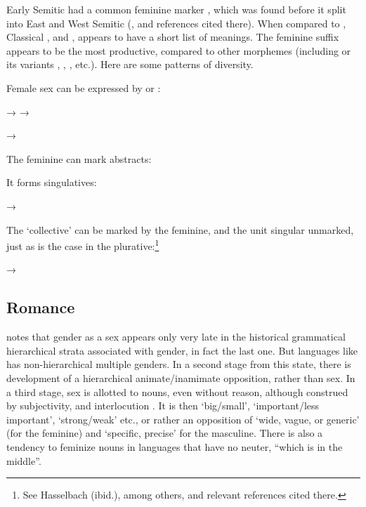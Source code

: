 Early Semitic had a common feminine marker , which was found
 before it split into East and West Semitic (\citealt{Hasselbach2014}, and references cited there).
 When compared to
, Classical , and ,  appears to have a short list of
meanings. The feminine suffix  appears to be the most productive,
compared to other morphemes (including  or its variants ,
, , etc.). Here are some patterns of  diversity.

Female sex can be expressed by  or :

\begin{exe}
  \ex\label{ex:fassi:62}
  \begin{xlist}
    \ex\label{ex:fassi:62a}  → 
    \ex\label{ex:fassi:62b}  → 
  \end{xlist}
  \ex\label{ex:fassi:63}  → 
\end{exe}
%
The feminine can mark abstracts:

\begin{exe}
  \ex\label{ex:fassi:64} 
\end{exe}
%
It forms singulatives:

\begin{exe}
  \ex\label{ex:fassi:65}  → 
\end{exe}
%
The `collective' can be marked by the feminine, and the unit singular unmarked,
just as is the case in the  plurative:\footnote{See Hasselbach (ibid.),
among others, and relevant references cited there.}

\begin{exe}
  \ex\label{ex:fassi:66}
  \begin{xlist}
    \ex\label{ex:fassi:66a}  → 
    \ex\label{ex:fassi:66b} 
  \end{xlist}
\end{exe}

\subsection{Romance}

\citet{DeLaGrasserie1904} notes that gender as a sex appears only very late in
the historical grammatical hierarchical strata associated with gender, in fact
the last one. But languages like  has non-hierarchical multiple genders.
In a second stage from this state, there is development of a hierarchical
animate/inamimate opposition, rather than sex. In a third stage, sex is
allotted to nouns, even without reason, although construed by subjectivity, and
interlocution \citep[226--227]{DeLaGrasserie1904}. It is then 
`big/small',
`important/less important', 
`strong/weak' etc., 
or rather an opposition of
`wide, vague, or generic' (for the feminine) and
`specific, precise' for
the masculine. There is also a tendency to feminize nouns in languages that
have no neuter, ``which is in the middle''.

